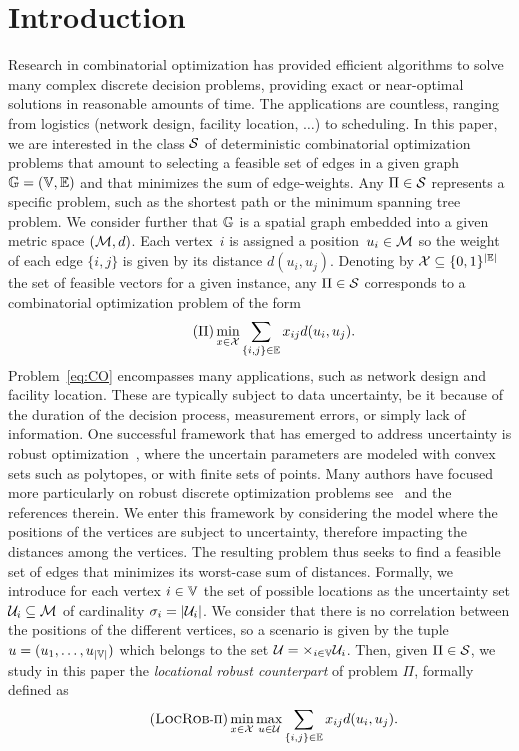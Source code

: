 \documentclass[12pt]{article}
\newcommand{\blue}[1]{{\color{black}#1}}
\begin{document}
\section{Introduction}
Research in combinatorial optimization has provided efficient algorithms to solve many complex discrete decision problems, providing exact or near-optimal solutions in reasonable amounts of time. The applications are countless, ranging from logistics (network design, facility location, $\ldots$) to scheduling. \blue{In this paper, we are interested in the class $\mathcal{S}$ of deterministic combinatorial optimization problems that amount to selecting a feasible set of edges in a given graph $\mathbb{G}=(\mathbb{V},\mathbb{E})$ and that minimizes the sum of edge-weights. Any $\Pi\in \mathcal{S}$ represents a specific problem, such as the shortest path or the minimum spanning tree problem. We consider further that $\mathbb{G}$ is a spatial graph embedded into a given metric space $(\mathcal{M}, d)$. Each vertex~$i$ is assigned a position~$u_i\in\mathcal{M}$ so the weight of each edge $\{i,j\}$ is given by its distance $d(u_i,u_j)$. Denoting by $\mathcal{X}\subseteq\{0,1\}^{|\mathbb{E}|}$ the set of feasible vectors for a given instance, any $\Pi\in\mathcal{S}$ corresponds to a combinatorial optimization problem of the form
\begin{equation}
\tag{$\Pi$}
\label{eq:CO}
 \min_{x\in \mathcal{X}}\sum_{\{i,j\}\in \mathbb{E}} x_{ij }d(u_i,u_j).
\end{equation}
}
Problem~\ref{eq:CO} encompasses many applications, such as network design and facility location. %
These are typically subject to data uncertainty, be it because of the duration of the decision process, measurement errors, or simply lack of information. 
One successful framework that has emerged to address uncertainty is robust optimization~\citep{ben1998robust}, where the uncertain parameters are modeled with convex sets such as polytopes, or with finite sets of points.
\blue{Many authors have focused more particularly on robust discrete optimization problems see~\cite{BertsimasS03,BuchheimK18,kasperski2016robust,kouvelis2013robust} and the references therein.} 
We enter this framework by considering the model where the positions of the vertices are subject to uncertainty, therefore impacting the distances among the vertices. The resulting problem thus seeks to find \blue{a} feasible set of edges that minimizes its worst-case sum of distances. Formally, we introduce for each vertex $i\in \mathbb{V}$ the set of possible locations as the uncertainty set $\U_i%
\subseteq \Metric$ of cardinality ${\sigma_{i}}=|\mathcal{U}_i|$. \blue{We consider that there is no correlation between the positions of the different vertices, so a scenario is given by the tuple $u=(u_1,\ldots,u_{|\mathbb{V}|})$ which belongs to the set $\mathcal{U}=\times_{i\in \mathbb{V}}\mathcal{U}_i$. Then, given $\Pi\in\mathcal{S}$, we study in this paper the \emph{locational robust counterpart} of problem $\Pi$, formally defined as
\begin{equation}
\tag{\ROBUST{$\Pi$}}
\label{eq:minmaxCO}
\min_{x\in\X} \max_{\u\in\UU}\sum_{\{i,j\}\in \EE}x_{ij} d(u_i,u_j).
\end{equation}
}
\end{document}
